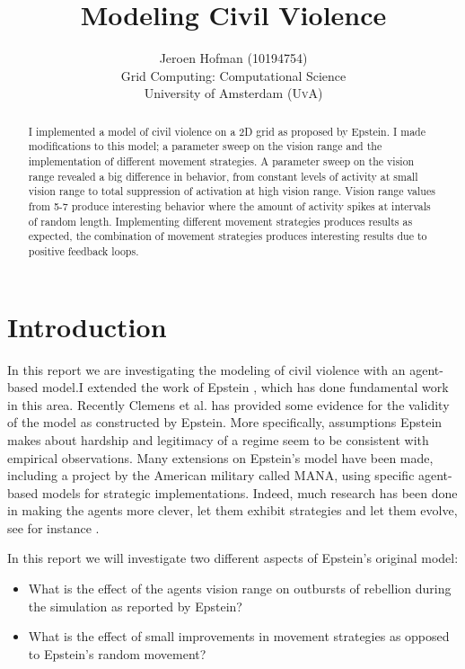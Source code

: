 \documentclass[11pt,a4paper,onecolumn]{article}
\author{Jeroen Hofman (10194754)  \\
  Grid Computing: Computational Science \\
  [15pt] University of Amsterdam (\textsc{UvA})}
\title{Modeling Civil Violence\\
		}
\begin{document}
\maketitle
\captionsetup{width=0.8\textwidth}
\graphicspath{{/home/jhofman/Desktop/2c2012/CSS/Figures/}}
\thispagestyle{empty}

\begin{center}
\begin{abstract}
\small{I implemented a model of civil violence on a 2D grid as proposed by Epstein. I made modifications to this model; a parameter sweep on the vision range and the implementation of different movement strategies. A parameter sweep on the vision range revealed a big difference in behavior, from constant levels of activity at small vision range to total suppression of activation at high vision range. Vision range values from 5-7 produce interesting behavior where the amount of activity spikes at intervals of random length. Implementing different movement strategies produces results as expected, the combination of movement strategies produces interesting results due to positive feedback loops.}
\end{abstract}
\end{center}

\newpage
\tableofcontents
\newpage

\section{Introduction}
In this report we are investigating the modeling of civil violence with an agent-based model.I extended the work of Epstein \cite{Epstein}, which has done fundamental work in this area. Recently Clemens et al. \cite{Epstein2} has provided some evidence for the validity of the model as constructed by Epstein. More specifically, assumptions Epstein makes about hardship and legitimacy of a regime seem to be consistent with empirical observations. Many extensions on Epstein's model have been made, including a project by the American military called MANA, using specific agent-based models for strategic implementations. Indeed, much research has been done in making the agents more clever, let them exhibit strategies and let them evolve, see for instance \cite{Quek}.

In this report we will investigate two different aspects of Epstein's original model:
\begin{itemize}
\item
  What is the effect of the agents vision range on outbursts of rebellion during the simulation as reported by Epstein?
\item
  What is the effect of small improvements in movement strategies as opposed to Epstein's random movement?
\end{itemize}
\end{document}
